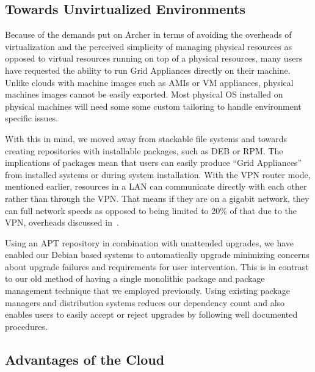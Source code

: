 \documentclass[twocolumn]{svjour3}
\begin{document}
\subsection{Towards Unvirtualized Environments}
\label{packaging}

Because of the demands put on Archer in terms of avoiding the overheads of
virtualization and the perceived simplicity of managing physical resources as
opposed to virtual resources running on top of a physical resources, many users
have requested the ability to run Grid Appliances directly on their machine.
Unlike clouds with machine images such as AMIs or VM appliances, physical
machines images cannot be easily exported.  Most physical OS installed on
physical machines will need some some custom tailoring to handle environment
specific issues.

With this in mind, we moved away from stackable file systems and towards
creating repositories with installable packages, such as DEB or RPM.  The
implications of packages mean that users can easily produce ``Grid Appliances''
from installed systems or during system installation.  With the VPN router
mode, mentioned earlier, resources in a LAN can communicate directly with each
other rather than through the VPN.  That means if they are on a gigabit
network, they can full network speeds as opposed to being limited to 20\% of
that due to the VPN, overheads discussed in~\cite{sc09}.

Using an APT repository in combination with unattended upgrades, we have
enabled our Debian based systems to automatically upgrade minimizing concerns
about upgrade failures and requirements for user intervention.  This is in
contrast to our old method of having a single monolithic package and package
management technique that we employed previously.  Using existing package
managers and distribution systems reduces our dependency count and also enables
users to easily accept or reject upgrades by following well documented
procedures.

\subsection{Advantages of the Cloud}
\end{document}
